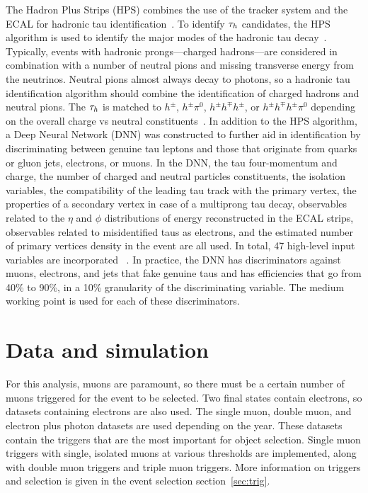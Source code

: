 
The Hadron Plus Strips (HPS) combines the use of the tracker system and the ECAL for hadronic tau identification~\cite{Sirunyan_2018}.  To identify $\tau_h$ candidates, the HPS algorithm is used to identify the major modes of the hadronic tau decay~\cite{Sirunyan_2018}. Typically, events with hadronic prongs---charged hadrons---are considered in combination with a number of neutral pions and missing transverse energy from the neutrinos. Neutral pions almost always decay to photons, so a hadronic tau identification algorithm should combine the identification of charged hadrons and neutral pions. 
The $\tau_h$ is matched to $h^{\pm}$, $h^{\pm}\pi^{0}$, $h^{\pm}h^{\mp}h^{\pm}$, or $h^{\pm}h^{\mp}h^{\pm}\pi^{0}$ depending on the overall charge vs neutral constituents~\cite{Sirunyan:2018pgf,Hassanshahi:2797703}.
In addition to the HPS algorithm, a Deep Neural Network (DNN) was constructed to further aid in identification by discriminating between genuine tau leptons and those that originate from quarks or gluon jets, electrons, or muons.  
In the DNN, the tau four-momentum and charge,
the number of charged and neutral particles constituents,
the isolation variables,
the compatibility of the leading tau track with the primary vertex,
the properties of a secondary vertex in case of a multiprong tau decay,
observables related to the $\eta$ and $\phi$ distributions of energy reconstructed in the ECAL strips,
observables related to misidentified taus as electrons, 
and the estimated number of primary vertices density in the event are all used. In total, 47 high-level input variables are incorporated 
~\cite{https://doi.org/10.48550/arxiv.2201.08458}.
In practice, the DNN has discriminators against muons, electrons, and jets that fake genuine taus and has efficiencies that go from 40\% to 90\%, in a 10\% granularity of the discriminating variable. The medium working point is used for each of these discriminators. 

 


\section{Data and simulation}
For this analysis, muons are paramount, so there must be a certain number of muons triggered for the event to be selected. Two final states contain electrons, so datasets containing electrons are also used. The single muon, double muon, and electron plus photon datasets are used depending on the year. These datasets contain the triggers that are the most important for object selection. Single muon triggers with single, isolated muons at various thresholds are implemented, along with double muon triggers and triple muon triggers. More information on triggers and selection is given in the event selection section~\ref{sec:trig}. 

